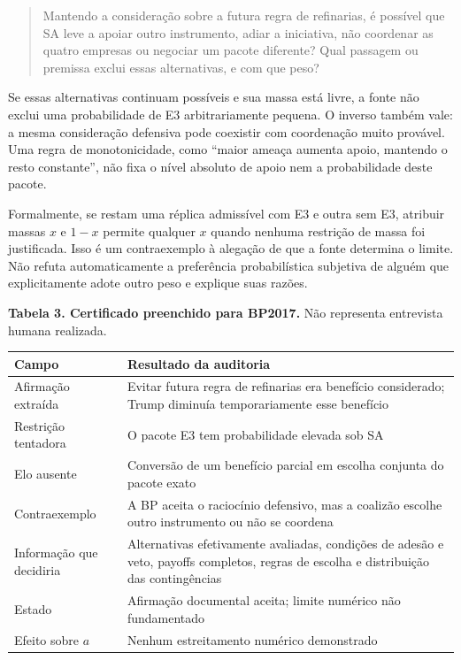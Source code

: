 \documentclass[
  brazilian,
  11pt,
  a4paper,
]{article}
\begin{document}
\begin{quote}
Mantendo a consideração sobre a futura regra de refinarias, é possível
que SA leve a apoiar outro instrumento, adiar a iniciativa, não
coordenar as quatro empresas ou negociar um pacote diferente? Qual
passagem ou premissa exclui essas alternativas, e com que peso?
\end{quote}

Se essas alternativas continuam possíveis e sua massa está livre, a
fonte não exclui uma probabilidade de E3 arbitrariamente pequena. O
inverso também vale: a mesma consideração defensiva pode coexistir com
coordenação muito provável. Uma regra de monotonicidade, como ``maior
ameaça aumenta apoio, mantendo o resto constante'', não fixa o nível
absoluto de apoio nem a probabilidade deste pacote.

Formalmente, se restam uma réplica admissível com E3 e outra sem E3,
atribuir massas \(x\) e \(1-x\) permite qualquer \(x\) quando nenhuma
restrição de massa foi justificada. Isso é um contraexemplo à alegação
de que a fonte determina o limite. Não refuta automaticamente a
preferência probabilística subjetiva de alguém que explicitamente adote
outro peso e explique suas razões.

\textbf{Tabela 3. Certificado preenchido para BP2017.} Não representa
entrevista humana realizada.

\begin{longtable}[]{@{}
  >{\raggedright\arraybackslash}p{}
  >{\raggedright\arraybackslash}p{}@{}}
\toprule\noalign{}
\begin{minipage}[b]{\linewidth}\raggedright
Campo
\end{minipage} & \begin{minipage}[b]{\linewidth}\raggedright
Resultado da auditoria
\end{minipage} \\
\midrule\noalign{}
\endhead
\bottomrule\noalign{}
\endlastfoot
Afirmação extraída & Evitar futura regra de refinarias era benefício
considerado; Trump diminuía temporariamente esse benefício \\
Restrição tentadora & O pacote E3 tem probabilidade elevada sob SA \\
Elo ausente & Conversão de um benefício parcial em escolha conjunta do
pacote exato \\
Contraexemplo & A BP aceita o raciocínio defensivo, mas a coalizão
escolhe outro instrumento ou não se coordena \\
Informação que decidiria & Alternativas efetivamente avaliadas,
condições de adesão e veto, payoffs completos, regras de escolha e
distribuição das contingências \\
Estado & Afirmação documental aceita; limite numérico não
fundamentado \\
Efeito sobre \(a\) & Nenhum estreitamento numérico demonstrado \\
\end{longtable}
\end{document}
